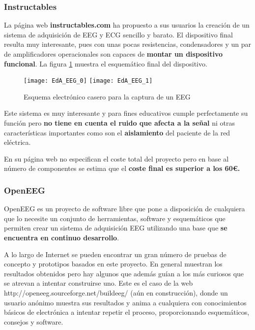 \subsubsection{Instructables}

La página web \textbf{instructables.com} ha propuesto a sus usuarios la creación de un sistema de adquisición de \acrshort{EEG} y \acrshort{ECG} sencillo y barato. El dispositivo final resulta muy interesante, pues con unas pocas resistencias, condensadores y un par de amplificadores operacionales son capaces de \textbf{montar un dispositivo funcional}. La figura \ref{fig:EdA_EEG_1} muestra el esquemático final del dispositivo.

\begin{figure} [h]
    \centering
    \texttt{[image: EdA\_EEG\_0]}
    \texttt{[image: EdA\_EEG\_1]}
    \caption{Esquema electrónico casero para la captura de un EEG \cite{DIY_EEG}}
    \label{fig:EdA_EEG_1}
\end{figure}

Este sistema es muy interesante y para fines educativos cumple perfectamente su función pero \textbf{no tiene en cuenta el ruido que afecta a la señal} ni otras características importantes como son el \textbf{aislamiento} del paciente de la red eléctrica.

En su página web no especifican el coste total del proyecto pero en base al número de componentes se estima que el \textbf{coste final es superior a los 60€.}

\subsubsection{OpenEEG}

OpenEEG es un proyecto de software libre que pone a disposición de cualquiera que lo necesite un conjunto de herramientas, software y esquemáticos que permiten crear un sistema de adquisición \acrshort{EEG} utilizando una base que \textbf{se encuentra en continuo desarrollo}.

A lo largo de Internet se pueden encontrar un gran número de pruebas de concepto y prototipos basados en este proyecto. En general muestran los resultados obtenidos pero hay algunos que además guían a los más curiosos que se atrevan a intentar construirse uno. Este es el caso de la web http://openeeg.sourceforge.net/buildeeg/ (aún en construcción), donde un usuario anónimo muestra sus resultados y anima a cualquiera con conocimientos básicos de electrónica a intentar repetir el proceso, proporcionando esquemáticos, consejos y software.

